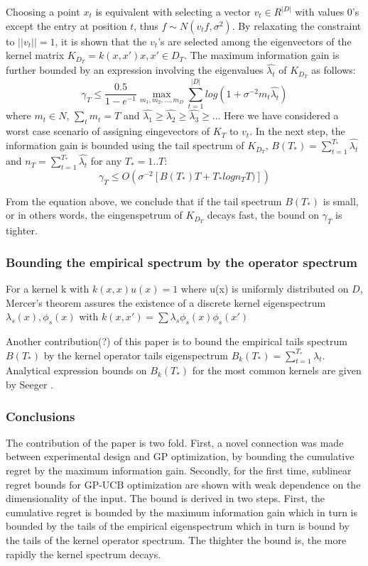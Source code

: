 \documentclass[10pt,journal,a4paper]{IEEEtran}
\begin{document}
Choosing a point $x_t$ is equivalent with selecting a vector $v_t\in R^{|D|}$ with values 0's except the entry at position $t$, thus $f\sim N(v_tf,\sigma^2)$. By relaxating the constraint to $||v_t|| = 1$, it is shown that the $v_t$'s are selected among the eigenvectors of the kernel matrix $K_{D_T} = k(x,x') x,x' \in D_T$. The maximum information gain is further bounded by an expression involving the eigenvalues $\hat{\lambda_t}$ of $K_{D_T}$ as follows:		
\begin{equation}		
	\gamma_T \leq \frac{0.5}{1-e^{-1}} \max_{m_1,m_2,...,m_D} \sum_{t=1}^{|D|} log(1 + \sigma^{-2}m_t \hat{\lambda_t})		
\end{equation}		
where $m_t\in N$, $\sum_t m_t = T$ and $\hat{\lambda_1} \geq \hat{\lambda_2} \geq \hat{\lambda_3} \geq ..$. Here we have considered a worst case scenario of assigning eingevectors of $K_T$ to $v_t$.			
In the next step, the information gain is bounded using the tail spectrum of $K_{D_T}$, $B(T_{*}) = \sum_{t=1}^{T_*}\hat{\lambda_t}$ and $n_T = \sum_{t=1}^{T_*} \hat{\lambda_t}$ for any $T_{*}=1..T$:		
\begin{equation}		
\gamma_{T} \leq O(\sigma^{-2}[B(T_{*})T + T_{*}logn_T T)])		
\end{equation}		
		
From the equation above, we conclude that if the tail spectrum $B(T_{*})$ is small, or in others words, the eingenspetrum of $K_{D_T}$ decays fast, the bound on $\gamma_T$ is tighter.		
\subsubsection{Bounding the empirical spectrum by the operator spectrum}		
For a kernel k with $k(x,x)u(x)=1$ where u(x) is uniformly distributed on $D$, Mercer's theorem assures the existence of a discrete kernel eigenspectrum {$\lambda_s(x), \phi_s(x)$}		
with $k(x,x') = \sum \lambda_s\phi_s(x) \phi_s(x')$		
		
Another contribution(?) of this paper is to bound the empirical tails spectrum $B(T_{*})$ by the kernel operator tails eigenspectrum $B_k(T_{*}) = \sum_{t=1}^{T_*}\lambda_t $. Analytical expression bounds on $B_k(T_{*})$ for the most common kernels are given by Seeger \cite{NonGP}.		
		
\subsubsection{Conclusions}		
The contribution of the paper is two fold. First, a novel connection was made between experimental design and GP optimization, by bounding the cumulative regret by the maximum information gain. Secondly, for the first time, sublinear regret bounds for GP-UCB optimization are shown with weak dependence on the dimensionality of the input. 		
 The bound is derived in two steps. First, the cumulative regret is bounded by the maximum information gain which in turn is bounded by the tails of the empirical eigenspectrum which in turn is bound by the tails of the kernel operator spectrum. The thighter the bound is, the more rapidly the kernel spectrum decays. 
\end{document}
